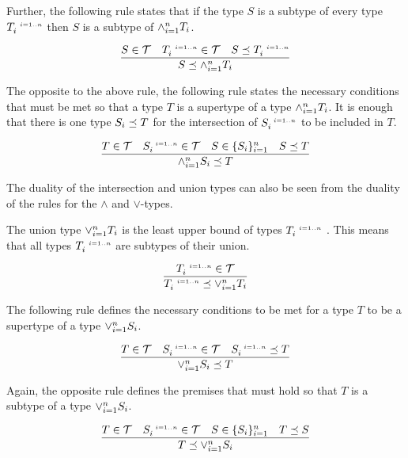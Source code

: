 \documentclass[runningheads]{llncs}
\newcommand{\s}{\scriptscriptstyle\ \,}
\newcommand{\T}{{\cal T}}
\begin{document}
Further, the following rule states that if the type $S$ is a subtype
of every type $T_i^{\s\/i=1..n}$ then $S$ is a subtype of
$\land_{i=1}^n\/T_i$.

\begin{equation}
\label{rul:lbound-preceq-land}
\dfrac{S\in\T\quad\/T_i^{\s\/i=1..n}\in\T\quad\/S\preceq\/T_i^{\s\/i=1..n}}
      {S\preceq\land_{i=1}^n\/T_i}  
\end{equation} 

The opposite to the above rule, the following rule states the
necessary conditions that must be met so that a type $T$ is a
supertype of a type $\land_{i=1}^n\/T_i$. It is enough that there is
one type $S_i\preceq\/T$ for the intersection of $S_i^{\s\/i=1..n}$ to
be included in $T$.

\begin{equation}
\label{rul:land-preceq-ubound}
\dfrac{T\in\T\quad\/S_i^{\s\/i=1..n}\in\T\quad\/S\in\{S_i\}_{i=1}^n\quad\/S\preceq\/T}
      {\land_{i=1}^n\/S_i\preceq\/T}  
\end{equation} 

The duality of the intersection and union types can also be seen from
the duality of the rules for the $\land$ and $\lor$-types.

The union type $\lor_{i=1}^n\/T_i$ is the least upper bound of
types $T_i^{\s\/i=1..n}$ \cite{Pierce1991}. This means that all types
$T_i^{\s\/i=1..n}$ are subtypes of their union. 

\begin{equation}
\label{rul:lor-preceq-elems}
\dfrac{T_i^{\s\/i=1..n}\in\T}
      {T_i^{\s\/i=1..n}\preceq\lor_{i=1}^n\/T_i}
\end{equation}

The following rule defines the necessary conditions to be met for a
type $T$ to be a supertype of a type $\lor_{i=1}^n\/S_i$.

\begin{equation}
\label{rul:lor-preceq-ubound}
\dfrac{T\in\T\quad\/S_i^{\s\/i=1..n}\in\T\quad\/S_i^{\s\/i=1..n}\preceq\/T}
      {\lor_{i=1}^n\/S_i\preceq\/T}  
\end{equation}

Again, the opposite rule defines the premises that must hold so that
$T$ is a subtype of a type $\lor_{i=1}^n\/S_i$.

\begin{equation}
\label{rul:lbound-preceq-lor}
\dfrac{T\in\T\quad\/S_i^{\s\/i=1..n}\in\T\quad\/S\in\{S_i\}_{i=1}^n\quad\/T\preceq\/S}
      {T\preceq\lor_{i=1}^n\/S_i}  
\end{equation}
\end{document}
